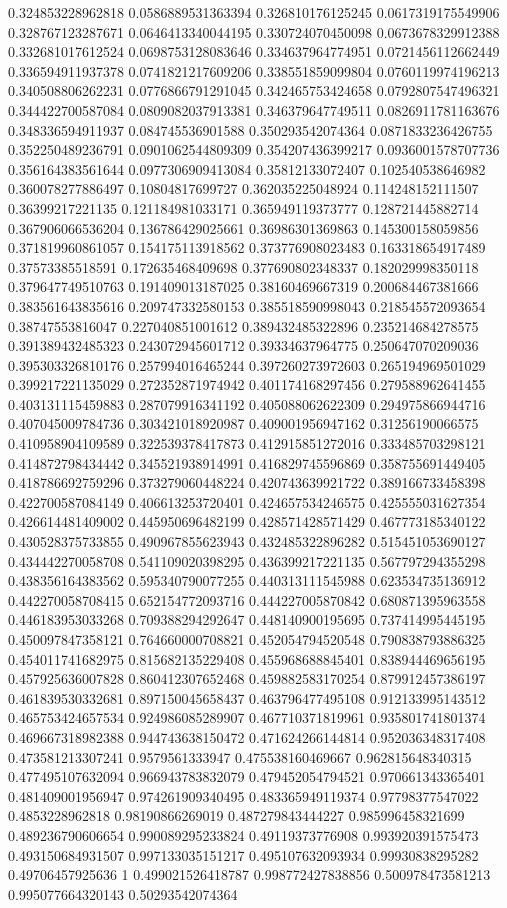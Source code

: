 \begin{table}
\begin{tabu}
\begin{sparkline}{10}
0.324853228962818 0.0586889531363394 0.326810176125245 0.0617319175549906 0.328767123287671 0.0646413340044195 0.330724070450098 0.0673678329912388 0.332681017612524 0.0698753128083646 0.334637964774951 0.0721456112662449 0.336594911937378 0.0741821217609206 0.338551859099804 0.0760119974196213 0.340508806262231 0.0776866791291045 0.342465753424658 0.0792807547496321 0.344422700587084 0.0809082037913381 0.346379647749511 0.0826911781163676 0.348336594911937 0.084745536901588 0.350293542074364 0.0871833236426755 0.352250489236791 0.0901062544809309 0.354207436399217 0.0936001578707736 0.356164383561644 0.0977306909413084 0.35812133072407 0.102540538646982 0.360078277886497 0.10804817699727 0.362035225048924 0.114248152111507 0.36399217221135 0.121184981033171 0.365949119373777 0.128721445882714 0.367906066536204 0.136786429025661 0.36986301369863 0.145300158059856 0.371819960861057 0.154175113918562 0.373776908023483 0.163318654917489 0.37573385518591 0.172635468409698 0.377690802348337 0.182029998350118 0.379647749510763 0.191409013187025 0.38160469667319 0.200684467381666 0.383561643835616 0.209747332580153 0.385518590998043 0.218545572093654 0.38747553816047 0.227040851001612 0.389432485322896 0.235214684278575 0.391389432485323 0.243072945601712 0.39334637964775 0.250647070209036 0.395303326810176 0.257994016465244 0.397260273972603 0.265194969501029 0.399217221135029 0.272352871974942 0.401174168297456 0.279588962641455 0.403131115459883 0.287079916341192 0.405088062622309 0.294975866944716 0.407045009784736 0.303421018920987 0.409001956947162 0.31256190066575 0.410958904109589 0.322539378417873 0.412915851272016 0.333485703298121 0.414872798434442 0.345521938914991 0.416829745596869 0.358755691449405 0.418786692759296 0.373279060448224 0.420743639921722 0.389166733458398 0.422700587084149 0.406613253720401 0.424657534246575 0.425555031627354 0.426614481409002 0.445950696482199 0.428571428571429 0.467773185340122 0.430528375733855 0.490967855623943 0.432485322896282 0.515451053690127 0.434442270058708 0.541109020398295 0.436399217221135 0.567797294355298 0.438356164383562 0.595340790077255 0.440313111545988 0.623534735136912 0.442270058708415 0.652154772093716 0.444227005870842 0.680871395963558 0.446183953033268 0.709388294292647 0.448140900195695 0.737414995445195 0.450097847358121 0.764660000708821 0.452054794520548 0.790838793886325 0.454011741682975 0.815682135229408 0.455968688845401 0.838944469656195 0.457925636007828 0.860412307652468 0.459882583170254 0.879912457386197 0.461839530332681 0.897150045658437 0.463796477495108 0.912133995143512 0.465753424657534 0.924986085289907 0.467710371819961 0.935801741801374 0.469667318982388 0.944743638150472 0.471624266144814 0.952036348317408 0.473581213307241 0.9579561333947 0.475538160469667 0.962815648340315 0.477495107632094 0.966943783832079 0.479452054794521 0.970661343365401 0.481409001956947 0.974261909340495 0.483365949119374 0.97798377547022 0.4853228962818 0.98190866269019 0.487279843444227 0.985996458321699 0.489236790606654 0.990089295233824 0.49119373776908 0.993920391575473 0.493150684931507 0.997133035151217 0.495107632093934 0.99930838295282 0.49706457925636 1 0.499021526418787 0.998772427838856 0.500978473581213 0.995077664320143 0.50293542074364 
\end{sparkline}
\end{tabu}
\end{table}
